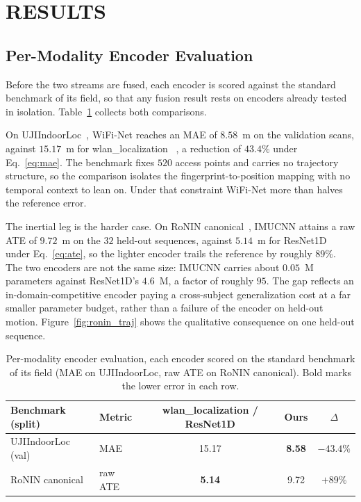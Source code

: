\section{\uppercase{Results}}

\subsection{Per-Modality Encoder Evaluation}

\noindent
Before the two streams are fused, each encoder is scored against the standard
benchmark of its field, so that any fusion result rests on encoders already
tested in isolation. Table~\ref{tab:perleg} collects both comparisons.

On UJIIndoorLoc~\cite{torressospedra2014ujiindoorloc}, WiFi-Net reaches an MAE
of $8.58$~m on the validation scans, against $15.17$~m for wlan\_localization~%
\cite{wlanloc}, a reduction of $43.4\%$ under Eq.~\eqref{eq:mae}.
The benchmark fixes $520$ access points and carries no trajectory structure, so
the comparison isolates the fingerprint-to-position mapping with no temporal
context to lean on. Under that constraint WiFi-Net more than halves the
reference error.

The inertial leg is the harder case. On RoNIN canonical~\cite{yan2019ronin},
IMUCNN attains a raw ATE of $9.72$~m on the $32$ held-out sequences, against
$5.14$~m for ResNet1D~\cite{yan2019ronin} under Eq.~\eqref{eq:ate}, so the
lighter encoder trails the reference by roughly $89\%$.
The two encoders are not the same size: IMUCNN carries about $0.05$~M
parameters against ResNet1D's $4.6$~M, a factor of roughly $95$. The gap
reflects an in-domain-competitive encoder paying a cross-subject generalization
cost at a far smaller parameter budget, rather than a failure of the encoder on
held-out motion. Figure~\ref{fig:ronin_traj} shows the qualitative consequence
on one held-out sequence.

\begin{table}[tb]
\caption{Per-modality encoder evaluation, each encoder scored on the standard
  benchmark of its field (MAE on UJIIndoorLoc, raw ATE on RoNIN canonical).
  Bold marks the lower error in each row.}\label{tab:perleg}
\centering
\begin{tabular}{|l|l|c|c|c|}\hline
Benchmark (split) & Metric & wlan\_localization / ResNet1D & Ours & $\Delta$ \\ \hline
UJIIndoorLoc (val) & MAE & 15.17 & \textbf{8.58} & $-43.4\%$ \\ \hline
RoNIN canonical & raw ATE & \textbf{5.14} & 9.72 & $+89\%$ \\ \hline
\end{tabular}
\end{table}

